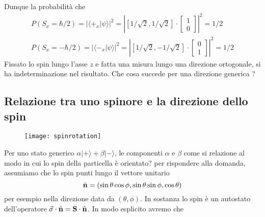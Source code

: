 Dunque la probabilit\`a che 
\begin{align*}
	P(S_x = \hbar/2) = | \langle +_x |\psi \rangle|^2 = \left | [1/\sqrt{2}, 1/\sqrt{2}] \cdot \left [\begin{array}{c}
		1 \\ 0
	\end{array} \right ] \right |^2 = 1/2 \\[0.5cm]
	P(S_x = -\hbar/2) = | \langle -_x |\psi \rangle|^2 = \left | [1/\sqrt{2}, -1/\sqrt{2}] \cdot \left [\begin{array}{c}
		0\\ 1
	\end{array} \right ] \right | ^2 = 1/2
\end{align*}
Fissato lo spin lungo l'asse $z$ e fatta una misura lungo una direzione ortogonale, si ha indeterminazione nel risultato. Che cosa succede per una direzione generica ?

\subsection{Relazione tra uno spinore e la direzione dello spin}
\begin{wrapfigure}{r}{0.4\textwidth} %
    \centering
    \texttt{[image: spinrotation]} %
\end{wrapfigure}

Per uno stato generico $\alpha |+ \rangle + \beta |- \rangle $, le componenti $\alpha $ e $\beta$ come si relazione al modo in cui lo spin della particella \`e orientato? per rispondere alla domanda, assumiamo che lo spin punti lungo il vettore unitario
\begin{equation*}
	\hat{\bold{n}} = (\sin \theta \cos \phi , \sin \theta \sin \phi, \cos \theta)
\end{equation*}
per esempio nella direzione data da $(\theta, \phi)$. In sostanza lo spin \`e un autostato dell'operatore $\vec{\sigma } \cdot \hat{\bold{n}} = \bold{S} \cdot \hat{\bold{n}}$. In modo esplicito avremo che 


